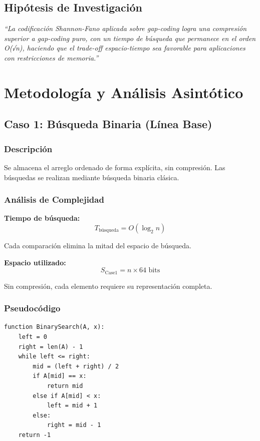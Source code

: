 \documentclass[11pt, twocolumn]{article}
\begin{document}
\subsection{Hipótesis de Investigación}

\textit{``La codificación Shannon-Fano aplicada sobre gap-coding logra una compresión superior a gap-coding puro, con un tiempo de búsqueda que permanece en el orden O(√n), haciendo que el trade-off espacio-tiempo sea favorable para aplicaciones con restricciones de memoria.''}

\section{Metodología y Análisis Asintótico}

\subsection{Caso 1: Búsqueda Binaria (Línea Base)}

\subsubsection{Descripción}
Se almacena el arreglo ordenado de forma explícita, sin compresión. Las búsquedas se realizan mediante búsqueda binaria clásica.

\subsubsection{Análisis de Complejidad}

\textbf{Tiempo de búsqueda:}
\begin{equation}
T_{\text{búsqueda}} = O(\log_2 n)
\end{equation}

Cada comparación elimina la mitad del espacio de búsqueda.

\textbf{Espacio utilizado:}
\begin{equation}
S_{\text{Case1}} = n \times 64 \text{ bits}
\end{equation}

Sin compresión, cada elemento requiere su representación completa.

\subsubsection{Pseudocódigo}

\begin{lstlisting}
function BinarySearch(A, x):
    left = 0
    right = len(A) - 1
    while left <= right:
        mid = (left + right) / 2
        if A[mid] == x:
            return mid
        else if A[mid] < x:
            left = mid + 1
        else:
            right = mid - 1
    return -1
\end{lstlisting}
\end{document}
